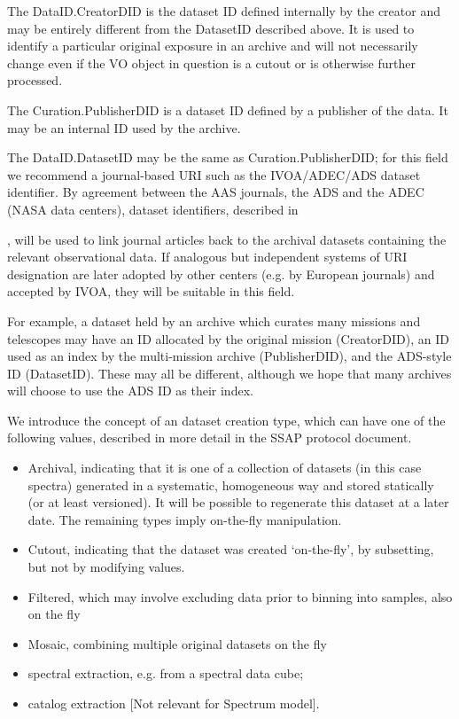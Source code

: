 \documentclass[11pt]{article}
\newcommand{\link}[1]{{\color{dblue}\htmladdnormallink{#1}{}\par}}
\begin{document}
The DataID.CreatorDID is the dataset ID defined internally by
the creator and may be entirely different from the DatasetID described
above. It is used to identify a particular original exposure in an archive
and will not necessarily change even if the VO object in question is a cutout or
is otherwise further processed.

The Curation.PublisherDID is a dataset ID defined by a publisher
of the data. It may be an internal ID used by the archive.

The DataID.DatasetID may be the same as Curation.PublisherDID;
for this field we recommend a journal-based URI such
as the IVOA/ADEC/ADS dataset identifier.
By agreement between the AAS journals, the ADS and the ADEC (NASA data centers),
dataset identifiers, described in 
\link{http://vo.ads.harvard.edu/dv/},
will be used to link journal articles back
to the archival datasets containing the relevant observational data.
If analogous but independent systems of URI designation are later
adopted by other centers (e.g. by European journals) and accepted by IVOA,
they will be suitable in this field.

For example, a dataset held by an archive which curates many
missions and telescopes may have an ID allocated by the original
mission (CreatorDID), an ID used as an index by the multi-mission archive (PublisherDID),
and the ADS-style ID (DatasetID). These may all be different, although
we hope that many archives will choose to use the ADS ID as their index.

We introduce the concept of an dataset creation type, which
can have one of the following  values, described in more
detail in the SSAP protocol document.

\begin{itemize}

\item Archival, indicating that it is one of a collection of
datasets (in this case spectra) generated in a systematic, homogeneous
way and stored statically (or at least versioned). It will be possible
to regenerate this dataset at a later date. The remaining types
imply on-the-fly manipulation.

\item Cutout, indicating that the dataset was created `on-the-fly',
by subsetting, but not by modifying values.

\item Filtered,  which may involve excluding data prior
to binning into samples, also on the fly

\item Mosaic, combining multiple original datasets on the fly

\item spectral extraction, e.g. from a spectral data cube;

\item catalog extraction [Not relevant for Spectrum model].

\end{itemize}
\end{document}
